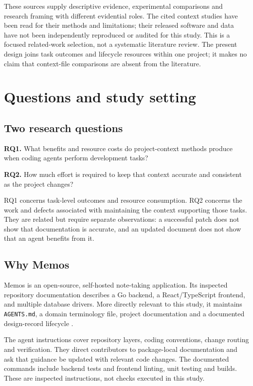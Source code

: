 \documentclass[11pt,letterpaper,twocolumn]{article}
\begin{document}
These sources supply descriptive evidence, experimental comparisons and research framing with different evidential roles. The cited context studies have been read for their methods and limitations; their released software and data have not been independently reproduced or audited for this study. This is a focused related-work selection, not a systematic literature review. The present design joins task outcomes and lifecycle resources within one project; it makes no claim that context-file comparisons are absent from the literature.

\section{Questions and study setting}
\subsection{Two research questions}
\textbf{RQ1.} What benefits and resource costs do project-context methods produce when coding agents perform development tasks?

\textbf{RQ2.} How much effort is required to keep that context accurate and consistent as the project changes?

RQ1 concerns task-level outcomes and resource consumption. RQ2 concerns the work and defects associated with maintaining the context supporting those tasks. They are related but require separate observations: a successful patch does not show that documentation is accurate, and an updated document does not show that an agent benefits from it.

\subsection{Why Memos}
Memos is an open-source, self-hosted note-taking application. Its inspected repository documentation describes a Go backend, a React/TypeScript frontend, and multiple database drivers. More directly relevant to this study, it maintains \texttt{AGENTS.md}, a domain terminology file, project documentation and a documented design-record lifecycle \citep{memos2026}.

The agent instructions cover repository layers, coding conventions, change routing and verification. They direct contributors to package-local documentation and ask that guidance be updated with relevant code changes. The documented commands include backend tests and frontend linting, unit testing and builds. These are inspected instructions, not checks executed in this study.
\end{document}
